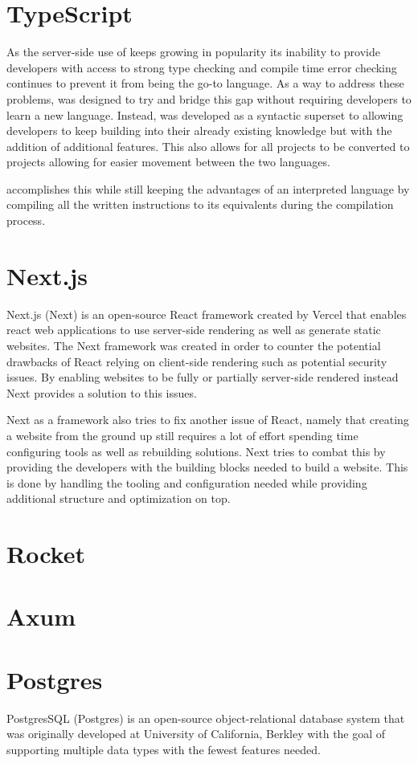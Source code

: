 \section{TypeScript}
As the server-side use of \javascript{} keeps growing in popularity its inability to provide developers with access to strong type checking and compile time error checking continues to prevent it from being the go-to language.
As a way to address these problems, \typescript{} was designed to try and bridge this gap without requiring developers to learn a new language.
Instead, \typescript{} was developed as a syntactic superset to \javascript{} allowing developers to keep building into their already existing knowledge but with the addition of additional features. 
This also allows for all \javascript{} projects to be converted to \typescript{} projects allowing for easier movement between the two languages\cite{TypeScript}. 

\typescript{} accomplishes this while still keeping the advantages of an interpreted language by compiling all the written instructions to its \javascript{} equivalents during the compilation process.

\section{Next.js}
Next.js (Next) is an open-source React framework created by Vercel that enables react web applications to use server-side rendering as well as generate static websites. The Next framework was created in order to counter the potential drawbacks of React relying on client-side rendering such as potential security issues. By enabling websites to be fully or partially server-side rendered instead Next provides a solution to this issues\cite {Nextjs_Docks}. 

Next as a framework also tries to fix another issue of React, namely that creating a website from the ground up still requires a lot of effort spending time configuring tools as well as rebuilding solutions. 
Next tries to combat this by providing the developers with the building blocks needed to build a website.
This is done by handling the tooling and configuration needed while providing additional structure and optimization on top\cite{Nextjs_Docks}.


\section{Rocket}
\section{Axum}


\section{Postgres}
PostgresSQL (Postgres) is an open-source object-relational database system that was originally developed at University of California, Berkley with the goal of supporting multiple data types with the fewest features needed. 



